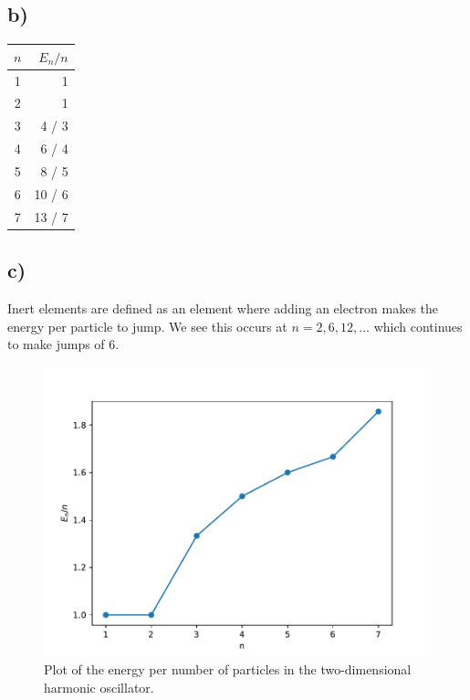 \documentclass{article}
\begin{document}
\subsection*{b)}
\begin{tabular}{ c|r }
$n$ &$E_n / n$ \\
\hline
1 &1 \\
2 &1 \\
3 &4 / 3 \\
4 &6 / 4 \\
5 &8 / 5 \\
6 &10 / 6 \\
7 &13 / 7 \\
\end{tabular}

\subsection*{c)}
Inert elements are defined as an element where adding an electron makes the energy per particle to jump. We see this occurs at $n = 2, 6, 12, \ldots$ which continues to make jumps of 6. 

\begin{figure}[h!]
\centering
\includegraphics[width = .85\textwidth]{8.5.pdf}
\caption{Plot of the energy per number of particles in the two-dimensional harmonic oscillator.}
\label{fig: 8.5}
\end{figure}
\end{document}
